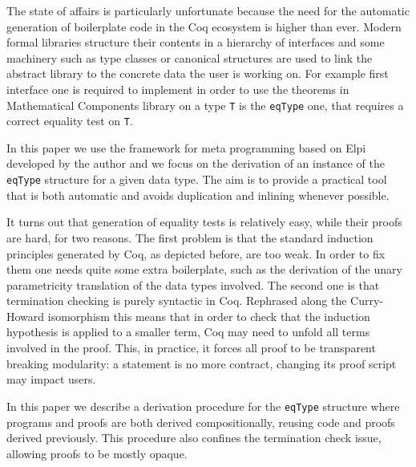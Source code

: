 \documentclass[sigplan,10pt,review]{acmart}\settopmatter{printfolios=true,printccs=false,printacmref=false}
\begin{document}
The state of affairs is particularly unfortunate because
the need for the automatic generation of boilerplate
code in the Coq ecosystem is higher than ever.
Modern formal libraries structure their contents in a
hierarchy of interfaces and some machinery such as type classes or
canonical structures are used to link the abstract library to the
concrete data the user is working on.  For example first interface one
is required to implement in order to use the theorems in Mathematical
Components library on a type \lstinline+T+ is the \lstinline+eqType+
one, that requires a correct equality test on \lstinline+T+.


In this paper we use the framework for meta programming based on Elpi
developed by the author and we focus on the derivation of an instance
of the
\lstinline+eqType+ structure for a given data type.
The aim is to provide a practical tool that is both automatic and
avoids duplication and inlining whenever possible.

It turns out that generation of equality tests is relatively easy,
while their proofs are hard, for two reasons. The first problem is that 
the standard induction principles generated by Coq, as depicted
before, are too weak. In order to fix them one needs quite some extra
boilerplate, such as the derivation of the unary parametricity
translation of the data types involved.
The second one is that termination checking
is purely syntactic in Coq. Rephrased along the Curry-Howard
isomorphism this means that in order to check that the induction
hypothesis is applied to a smaller term, Coq may need to unfold all
terms involved in the proof. This, in practice, it forces all proof to
be transparent breaking modularity: a statement is no more contract,
changing its proof script may impact users.

In this paper we describe a derivation procedure for the
\lstinline+eqType+ structure where programs and proofs are both
derived compositionally, reusing code and proofs derived previously.
This procedure also confines the termination check issue,
allowing proofs to be mostly opaque.
\end{document}
